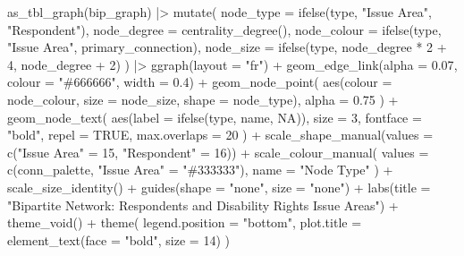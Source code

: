 \documentclass[
  letterpaper,
  DIV=11,
  numbers=noendperiod]{scrartcl}
\newenvironment{Shaded}{\begin{snugshade}}{\end{snugshade}}
\newcommand{\AttributeTok}[1]{\textcolor[rgb]{0.40,0.45,0.13}{#1}}
\newcommand{\ConstantTok}[1]{\textcolor[rgb]{0.56,0.35,0.01}{#1}}
\newcommand{\DecValTok}[1]{\textcolor[rgb]{0.68,0.00,0.00}{#1}}
\newcommand{\FloatTok}[1]{\textcolor[rgb]{0.68,0.00,0.00}{#1}}
\newcommand{\FunctionTok}[1]{\textcolor[rgb]{0.28,0.35,0.67}{#1}}
\newcommand{\NormalTok}[1]{\textcolor[rgb]{0.00,0.23,0.31}{#1}}
\newcommand{\OtherTok}[1]{\textcolor[rgb]{0.00,0.23,0.31}{#1}}
\newcommand{\SpecialCharTok}[1]{\textcolor[rgb]{0.37,0.37,0.37}{#1}}
\newcommand{\StringTok}[1]{\textcolor[rgb]{0.13,0.47,0.30}{#1}}
\begin{document}
\begin{Shaded}
\begin{Highlighting}[]
\FunctionTok{as\_tbl\_graph}\NormalTok{(bip\_graph) }\SpecialCharTok{|\textgreater{}}
  \FunctionTok{mutate}\NormalTok{(}
    \AttributeTok{node\_type   =} \FunctionTok{ifelse}\NormalTok{(type, }\StringTok{"Issue Area"}\NormalTok{, }\StringTok{"Respondent"}\NormalTok{),}
    \AttributeTok{node\_degree =} \FunctionTok{centrality\_degree}\NormalTok{(),}
    \AttributeTok{node\_colour =} \FunctionTok{ifelse}\NormalTok{(type, }\StringTok{"Issue Area"}\NormalTok{, primary\_connection),}
    \AttributeTok{node\_size   =} \FunctionTok{ifelse}\NormalTok{(type, node\_degree }\SpecialCharTok{*} \DecValTok{2} \SpecialCharTok{+} \DecValTok{4}\NormalTok{, node\_degree }\SpecialCharTok{+} \DecValTok{2}\NormalTok{)}
\NormalTok{  ) }\SpecialCharTok{|\textgreater{}}
  \FunctionTok{ggraph}\NormalTok{(}\AttributeTok{layout =} \StringTok{"fr"}\NormalTok{) }\SpecialCharTok{+}
  \FunctionTok{geom\_edge\_link}\NormalTok{(}\AttributeTok{alpha =} \FloatTok{0.07}\NormalTok{, }\AttributeTok{colour =} \StringTok{"\#666666"}\NormalTok{, }\AttributeTok{width =} \FloatTok{0.4}\NormalTok{) }\SpecialCharTok{+}
  \FunctionTok{geom\_node\_point}\NormalTok{(}
    \FunctionTok{aes}\NormalTok{(}\AttributeTok{colour =}\NormalTok{ node\_colour, }\AttributeTok{size =}\NormalTok{ node\_size, }\AttributeTok{shape =}\NormalTok{ node\_type),}
    \AttributeTok{alpha =} \FloatTok{0.75}
\NormalTok{  ) }\SpecialCharTok{+}
  \FunctionTok{geom\_node\_text}\NormalTok{(}
    \FunctionTok{aes}\NormalTok{(}\AttributeTok{label =} \FunctionTok{ifelse}\NormalTok{(type, name, }\ConstantTok{NA}\NormalTok{)),}
    \AttributeTok{size =} \DecValTok{3}\NormalTok{, }\AttributeTok{fontface =} \StringTok{"bold"}\NormalTok{, }\AttributeTok{repel =} \ConstantTok{TRUE}\NormalTok{, }\AttributeTok{max.overlaps =} \DecValTok{20}
\NormalTok{  ) }\SpecialCharTok{+}
  \FunctionTok{scale\_shape\_manual}\NormalTok{(}\AttributeTok{values =} \FunctionTok{c}\NormalTok{(}\StringTok{"Issue Area"} \OtherTok{=} \DecValTok{15}\NormalTok{, }\StringTok{"Respondent"} \OtherTok{=} \DecValTok{16}\NormalTok{)) }\SpecialCharTok{+}
  \FunctionTok{scale\_colour\_manual}\NormalTok{(}
    \AttributeTok{values =} \FunctionTok{c}\NormalTok{(conn\_palette, }\StringTok{"Issue Area"} \OtherTok{=} \StringTok{"\#333333"}\NormalTok{),}
    \AttributeTok{name   =} \StringTok{"Node Type"}
\NormalTok{  ) }\SpecialCharTok{+}
  \FunctionTok{scale\_size\_identity}\NormalTok{() }\SpecialCharTok{+}
  \FunctionTok{guides}\NormalTok{(}\AttributeTok{shape =} \StringTok{"none"}\NormalTok{, }\AttributeTok{size =} \StringTok{"none"}\NormalTok{) }\SpecialCharTok{+}
  \FunctionTok{labs}\NormalTok{(}\AttributeTok{title =} \StringTok{"Bipartite Network: Respondents and Disability Rights Issue Areas"}\NormalTok{) }\SpecialCharTok{+}
  \FunctionTok{theme\_void}\NormalTok{() }\SpecialCharTok{+}
  \FunctionTok{theme}\NormalTok{(}
    \AttributeTok{legend.position =} \StringTok{"bottom"}\NormalTok{,}
    \AttributeTok{plot.title =} \FunctionTok{element\_text}\NormalTok{(}\AttributeTok{face =} \StringTok{"bold"}\NormalTok{, }\AttributeTok{size =} \DecValTok{14}\NormalTok{)}
\NormalTok{  )}
\end{Highlighting}
\end{Shaded}
\end{document}
